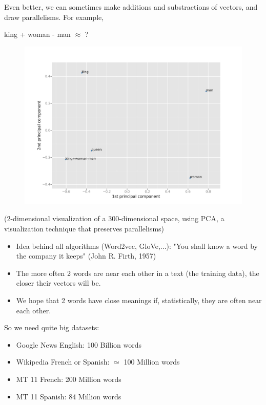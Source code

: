 \documentclass{beamer}
\begin{document}
\begin{frame}
Even better, we can sometimes make additions and substractions of vectors, and draw parallelisms. For example, 

\bigskip

\begin{center}
king + woman - man $\approx$ ?
\end{center}

\end{frame}



\begin{frame}



\begin{figure}
\includegraphics[width=0.85\linewidth]{wordsinenglishanalogyplus.png}
\end{figure}


(2-dimensional visualization of a 300-dimensional space, using PCA, a visualization technique that preserves parallelisms)


\end{frame}
	

\begin{frame}
\begin{itemize}
\item Idea behind all algorithms (Word2vec, GloVe,...): "You shall know a word by the company it keeps" (John R. Firth, 1957)
\item The more often 2 words are near each other in a text (the training data), the closer their vectors will be.
\item We hope that 2 words have close meanings if, statistically, they are often near each other.
\end{itemize}

So we need quite big datasets:


\begin{itemize}
\item Google News English: 100 Billion words
\item Wikipedia French or Spanish: $\simeq$ 100 Million words
\item MT 11 French: 200 Million words
\item MT 11 Spanish: 84 Million words 


\end{itemize}

\end{frame}
	
\end{document}
